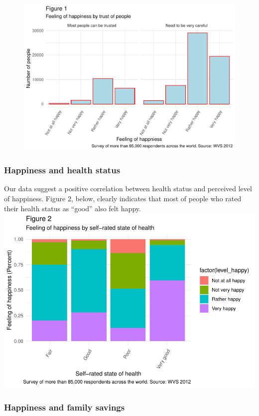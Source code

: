 \documentclass[man, fleqn, noextraspace,floatsintext]{apa6}
\begin{document}
\begin{figure}
\centering
\includegraphics{610_final_files/figure-latex/unnamed-chunk-1-1.pdf}
\caption{}
\end{figure}

\subsubsection{Happiness and health
status}\label{happiness-and-health-status}

Our data suggest a positive correlation between health status and
perceived level of happiness. Figure 2, below, clearly indicates that
most of people who rated their health status as \enquote{good} also felt
happy.
\includegraphics{610_final_files/figure-latex/unnamed-chunk-2-1.pdf}

\subsubsection{Happiness and family
savings}\label{happiness-and-family-savings}
\end{document}
